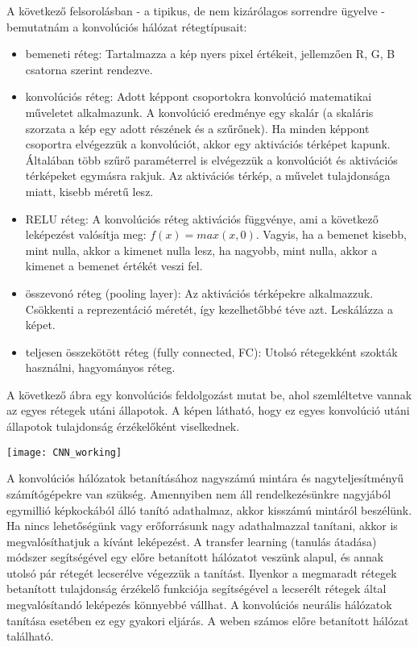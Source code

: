 A következő felsorolásban - a tipikus, de nem kizárólagos sorrendre ügyelve - bemutatnám a konvolúciós hálózat rétegtípusait:
\begin{itemize}
\item bemeneti réteg: Tartalmazza a kép nyers pixel értékeit, jellemzően R, G, B csatorna szerint rendezve.
\item konvolúciós réteg: Adott képpont csoportokra konvolúció matematikai műveletet alkalmazunk. A konvolúció eredménye egy skalár (a skaláris szorzata a kép egy adott részének és a szűrőnek). Ha minden képpont csoportra elvégezzük a konvolúciót, akkor egy aktivációs térképet kapunk. Általában több szűrő paraméterrel is elvégezzük a konvolúciót és aktivációs térképeket egymásra rakjuk. Az aktivációs térkép, a művelet tulajdonsága miatt, kisebb
méretű lesz.
\item RELU réteg: A konvolúciós réteg aktivációs függvénye, ami a következő leképezést valósítja meg: \(f(x) = max(x, 0)\). Vagyis, ha a bemenet kisebb, mint nulla, akkor a kimenet nulla lesz, ha nagyobb, mint nulla, akkor a kimenet a bemenet értékét veszi fel.
\item összevonó réteg (pooling layer): Az aktivációs térképekre alkalmazzuk. Csökkenti a reprezentáció méretét, így kezelhetőbbé téve azt. Leskálázza a képet.
\item teljesen összekötött réteg (fully connected, FC): Utolsó rétegekként szokták használni, hagyományos réteg. 
\end{itemize}

A következő ábra egy konvolúciós feldolgozást mutat be, ahol szemléltetve vannak az egyes rétegek utáni állapotok. A képen látható, hogy ez egyes konvolúció utáni állapotok tulajdonság érzékelőként viselkednek.

\begin{center}
\texttt{[image: CNN\_working]}
\end{center}

A konvolúciós hálózatok betanításához nagyszámú mintára és nagyteljesítményű számítógépekre van szükség. Amennyiben nem áll rendelkezésünkre nagyjából egymillió képkockából álló tanító adathalmaz, akkor kisszámú mintáról beszélünk. Ha nincs lehetőségünk vagy erőforrásunk nagy adathalmazzal tanítani, akkor is megvalósíthatjuk a kívánt leképezést. A transfer learning (tanulás átadása) módszer segítségével egy előre betanított hálózatot veszünk alapul, és annak utolsó pár rétegét lecserélve végezzük a tanítást. Ilyenkor a megmaradt rétegek betanított tulajdonság érzékelő funkciója segítségével a lecserélt rétegek által megvalósítandó leképezés könnyebbé vállhat. A konvolúciós neurális hálózatok tanítása esetében ez egy gyakori eljárás. A weben számos előre betanított hálózat található.
